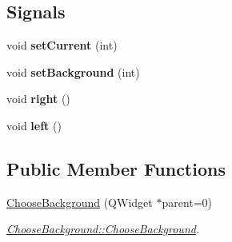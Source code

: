 \subsection*{Signals}
\begin{DoxyCompactItemize}
\item 
\hypertarget{class_choose_background_afe5384a4f9751980654331f16f9880d6}{}void {\bfseries set\+Current} (int)\label{class_choose_background_afe5384a4f9751980654331f16f9880d6}

\item 
\hypertarget{class_choose_background_a97f62dc7c7f8c0311bcb4d9de40f8961}{}void {\bfseries set\+Background} (int)\label{class_choose_background_a97f62dc7c7f8c0311bcb4d9de40f8961}

\item 
\hypertarget{class_choose_background_a60e09b439c577557e659a7c8cd17ef95}{}void {\bfseries right} ()\label{class_choose_background_a60e09b439c577557e659a7c8cd17ef95}

\item 
\hypertarget{class_choose_background_ad94244d54915e86b87745df492dab6e6}{}void {\bfseries left} ()\label{class_choose_background_ad94244d54915e86b87745df492dab6e6}

\end{DoxyCompactItemize}
\subsection*{Public Member Functions}
\begin{DoxyCompactItemize}
\item 
\hyperlink{class_choose_background_ab7ee660174665e9bc68eb183817ca099}{Choose\+Background} (Q\+Widget $\ast$parent=0)
\begin{DoxyCompactList}\small\item\em \hyperlink{class_choose_background_ab7ee660174665e9bc68eb183817ca099}{Choose\+Background\+::\+Choose\+Background}. \end{DoxyCompactList}\end{DoxyCompactItemize}

